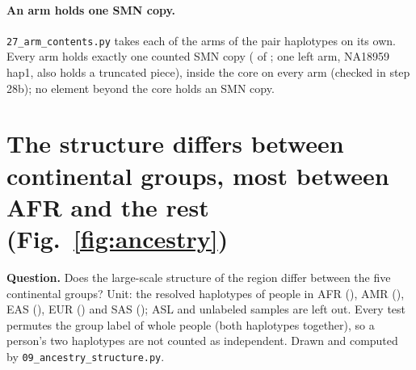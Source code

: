 \paragraph{An arm holds one SMN copy.} \texttt{27\_arm\_contents.py} takes each of the \armN{} arms of the pair
haplotypes on its own. Every arm holds exactly one counted SMN copy (\armOneCopy{} of \armN; one left arm, NA18959 hap1,
also holds a truncated piece), inside the core on every arm (checked in step 28b); no element beyond the core holds an SMN copy.



\section{The structure differs between continental groups, most between AFR and the rest (Fig.~\ref{fig:ancestry})}\label{sec:ancestry}
\textbf{Question.} Does the large-scale structure of the region differ between the five continental groups? Unit: the
\anHaps{} resolved haplotypes of \anPeople{} people in AFR (\anNAfr), AMR (\anNAmr), EAS (\anNEas), EUR (\anNEur) and
SAS (\anNSas); ASL and unlabeled samples are left out. Every test permutes the group label of whole people (both
haplotypes together), so a person's two haplotypes are not counted as independent. Drawn and computed by
\texttt{09\_ancestry\_structure.py}.

